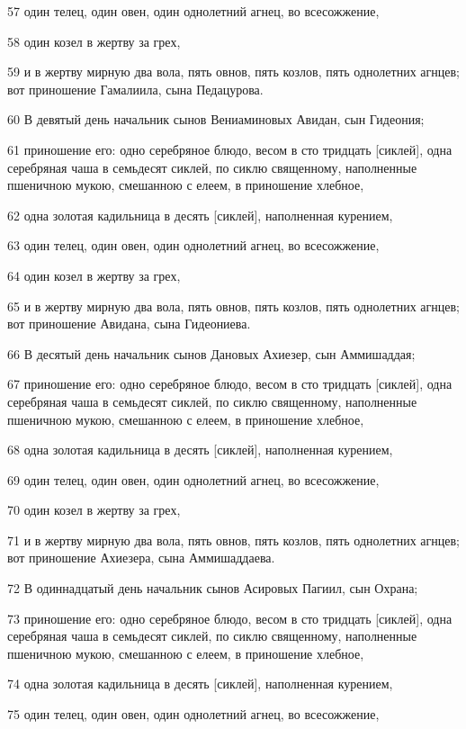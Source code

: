 \par 57 один телец, один овен, один однолетний агнец, во всесожжение,
\par 58 один козел в жертву за грех,
\par 59 и в жертву мирную два вола, пять овнов, пять козлов, пять однолетних агнцев; вот приношение Гамалиила, сына Педацурова.
\par 60 В девятый день начальник сынов Вениаминовых Авидан, сын Гидеония;
\par 61 приношение его: одно серебряное блюдо, весом в сто тридцать [сиклей], одна серебряная чаша в семьдесят сиклей, по сиклю священному, наполненные пшеничною мукою, смешанною с елеем, в приношение хлебное,
\par 62 одна золотая кадильница в десять [сиклей], наполненная курением,
\par 63 один телец, один овен, один однолетний агнец, во всесожжение,
\par 64 один козел в жертву за грех,
\par 65 и в жертву мирную два вола, пять овнов, пять козлов, пять однолетних агнцев; вот приношение Авидана, сына Гидеониева.
\par 66 В десятый день начальник сынов Дановых Ахиезер, сын Аммишаддая;
\par 67 приношение его: одно серебряное блюдо, весом в сто тридцать [сиклей], одна серебряная чаша в семьдесят сиклей, по сиклю священному, наполненные пшеничною мукою, смешанною с елеем, в приношение хлебное,
\par 68 одна золотая кадильница в десять [сиклей], наполненная курением,
\par 69 один телец, один овен, один однолетний агнец, во всесожжение,
\par 70 один козел в жертву за грех,
\par 71 и в жертву мирную два вола, пять овнов, пять козлов, пять однолетних агнцев; вот приношение Ахиезера, сына Аммишаддаева.
\par 72 В одиннадцатый день начальник сынов Асировых Пагиил, сын Охрана;
\par 73 приношение его: одно серебряное блюдо, весом в сто тридцать [сиклей], одна серебряная чаша в семьдесят сиклей, по сиклю священному, наполненные пшеничною мукою, смешанною с елеем, в приношение хлебное,
\par 74 одна золотая кадильница в десять [сиклей], наполненная курением,
\par 75 один телец, один овен, один однолетний агнец, во всесожжение,
